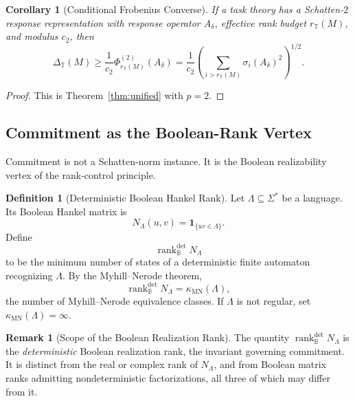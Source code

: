 \documentclass[12pt]{article}
\newtheorem{corollary}[theorem]{Corollary}
\theoremstyle{definition}
\newtheorem{definition}[theorem]{Definition}
\newtheorem{remark}[theorem]{Remark}
\newcommand{\rankBdet}{\operatorname{rank}_{\mathbb B}^{\mathrm{det}}}
\newcommand{\kappaMN}{\kappa_{\mathrm{MN}}}
\begin{document}
\begin{corollary}[Conditional Frobenius Converse]
\label{cor:l2}
If a task theory has a Schatten-$2$ response representation with response
operator $A_\delta$, effective rank budget $r_{\mathbb T}(M)$, and modulus
$c_2$, then
\[
\Delta_{\mathbb T}(M)
\ge
\frac1{c_2}
\Phi^{(2)}_{r_{\mathbb T}(M)}(A_\delta)
=
\frac1{c_2}
\left(
\sum_{i>r_{\mathbb T}(M)}
\sigma_i(A_\delta)^2
\right)^{1/2}.
\]
\end{corollary}

\begin{proof}
This is Theorem~\ref{thm:unified} with $p=2$.
\end{proof}

\subsection{Commitment as the Boolean-Rank Vertex}
\label{subsec:schatten-commitment}

Commitment is not a Schatten-norm instance.  It is the Boolean realizability
vertex of the rank-control principle.

\begin{definition}[Deterministic Boolean Hankel Rank]
\label{def:boolean-hankel-rank}
Let $\Lambda\subseteq\Sigma^*$ be a language.  Its Boolean Hankel matrix is
\[
N_\Lambda(u,v)
=
\mathbf 1_{\{uv\in\Lambda\}}.
\]
Define
\[
\rankBdet N_\Lambda
\]
to be the minimum number of states of a deterministic finite automaton
recognizing $\Lambda$.  By the Myhill--Nerode theorem,
\[
\rankBdet N_\Lambda
=
\kappaMN(\Lambda),
\]
the number of Myhill--Nerode equivalence classes.  If $\Lambda$ is not
regular, set $\kappaMN(\Lambda)=\infty$.
\end{definition}

\begin{remark}[Scope of the Boolean Realization Rank]
\label{rem:boolean-rank-not-ordinary}
The quantity $\rankBdet N_\Lambda$ is the \emph{deterministic} Boolean
realization rank, the invariant governing commitment.  It is distinct from the
real or complex rank of $N_\Lambda$, and from Boolean matrix ranks admitting
nondeterministic factorizations, all three of which may differ from it.
\end{remark}
\end{document}
